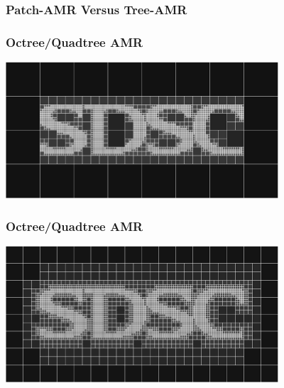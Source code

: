 \documentclass{beamer}
\begin{document}
\begin{frame}
\frametitle{Patch-AMR Versus Tree-AMR}

\end{frame}



\begin{frame}
\frametitle{Octree/Quadtree AMR}
\centerline{\includegraphics[width=4in]{sdsc-raw.eps}}
\end{frame}

\begin{frame}
\frametitle{Octree/Quadtree AMR}
\centerline{\includegraphics[width=4in]{sdsc-normal.eps}}
\end{frame}
\end{document}
